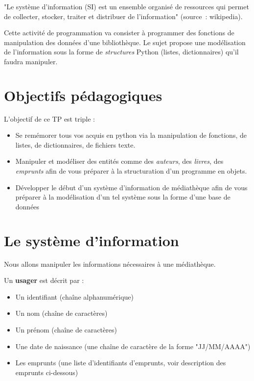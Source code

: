 \documentclass[10pt,a4paper]{sujets-exercices}
\begin{document}

"Le système d'information (SI) est un ensemble organisé de ressources qui permet de collecter, stocker, traiter et distribuer de l'information" (source~: wikipedia).

Cette activité de programmation va consister à programmer des fonctions de manipulation des données d'une bibliothèque. Le sujet propose une modélisation de l'information sous la forme de \emph{structures} Python (listes, dictionnaires) qu'il faudra manipuler.

\section{Objectifs pédagogiques}

L'objectif de ce TP est triple :

\begin{itemize}
\item Se remémorer tous vos acquis en python via la manipulation de fonctions, de listes, de dictionnaires, de fichiers texte.
\item Manipuler et modéliser des entités comme des \emph{auteurs}, des \emph{livres}, des \emph{emprunts} afin de vous préparer à la structuration d'un programme en objets.
\item Développer le début d'un système d'information de médiathèque afin de vous préparer à la modélisation d'un tel système sous la forme d'une base de données
\end{itemize}

\section{Le système d'information}

Nous allons manipuler les informations nécessaires à une médiathèque.

Un \textbf{usager} est décrit par : 

\begin{itemize}
\item Un identifiant (chaîne alphanumérique)
\item Un nom (chaîne de caractères)
\item Un prénom (chaîne de caractères)
\item Une date de naissance (une chaîne de caractère de la forme "JJ/MM/AAAA")
\item Les emprunts (une liste d'identifiants d'emprunts, voir description des emprunts ci-dessous)
\end{itemize}
\end{document}
